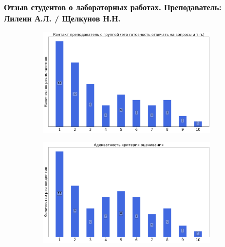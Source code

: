     \subsubsection{Отзыв студентов о лабораторных работах. Преподаватель: Лилеин А.Л. / Щелкунов Н.Н.}
		\begin{figure}[H]
			\centering
			\begin{subfigure}[b]{0.45\textwidth}
				\centering
				\includegraphics[width=\textwidth]{images/3 course/Лаборатория инфокоммуникационных технологий/labniks-marks-Лилеин А.Л-0.png}
			\end{subfigure}
			\begin{subfigure}[b]{0.45\textwidth}
				\centering
				\includegraphics[width=\textwidth]{images/3 course/Лаборатория инфокоммуникационных технологий/labniks-marks-Лилеин А.Л-1.png}
			\end{subfigure}
			\begin{subfigure}[b]{0.45\textwidth}
				\centering

\end{subfigure}
\end{figure}
